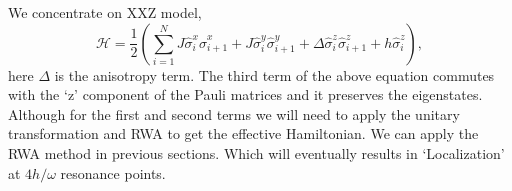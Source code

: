\documentclass[a4paper,11pt]{article}
\begin{document}
We concentrate on XXZ model,
\begin{equation}
	\mathcal{H} = \frac12 \left( \sum_{i=1}^N J \hat{\sigma}^x_i \hat{\sigma}^x_{i+1} +J  \hat{\sigma}^y_i \hat{\sigma}^y_{i+1} + \Delta \hat{\sigma}^z_i \hat{\sigma}^z_{i+1} + h  \hat{\sigma}^z_i\right),
\end{equation}
here $\Delta$ is the anisotropy term. The third term of the above equation commutes with the `z' component of the Pauli matrices and it preserves the eigenstates. 
Although for the first and second terms we will need to apply the unitary transformation and RWA to get the effective Hamiltonian. We can apply the RWA method in previous sections. Which will eventually results in `Localization' at $4h/\omega$ resonance points.
\end{document}
